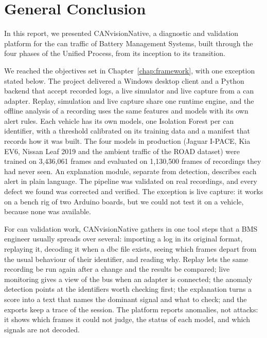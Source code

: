 \chapter*{General Conclusion}
\renewcommand*{\thischapterid}{none}

In this report, we presented CANvisionNative, a diagnostic and validation platform for the \gls{can} traffic of Battery Management Systems, built through the four phases of the Unified Process, from its inception to its transition.

We reached the objectives set in Chapter~\ref{chap:framework}, with one exception stated below. The project delivered a Windows desktop client and a Python backend that accept recorded logs, a live simulator and live capture from a \gls{can} adapter. Replay, simulation and live capture share one runtime engine, and the offline analysis of a recording uses the same features and models with its own alert rules. Each vehicle has its own models, one Isolation Forest per \gls{can} identifier, with a threshold calibrated on its training data and a manifest that records how it was built. The four models in production (Jaguar I-PACE, Kia EV6, Nissan Leaf 2019 and the ambient traffic of the ROAD dataset) were trained on 3{,}436{,}061 frames and evaluated on 1{,}130{,}500 frames of recordings they had never seen. An explanation module, separate from detection, describes each alert in plain language. The pipeline was validated on real recordings, and every defect we found was corrected and verified. The exception is live capture: it works on a bench rig of two Arduino boards, but we could not test it on a vehicle, because none was available.

For \gls{can} validation work, CANvisionNative gathers in one tool steps that a BMS engineer usually spreads over several: importing a log in its original format, replaying it, decoding it when a \gls{dbc} file exists, seeing which frames depart from the usual behaviour of their identifier, and reading why. Replay lets the same recording be run again after a change and the results be compared; live monitoring gives a view of the bus when an adapter is connected; the anomaly detection points at the identifiers worth checking first; the explanation turns a score into a text that names the dominant signal and what to check; and the exports keep a trace of the session. The platform reports anomalies, not attacks: it shows which frames it could not judge, the status of each model, and which signals are not decoded.

